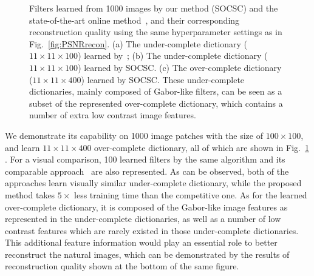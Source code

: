 \begin{figure}[h]
\begin{minipage}{1\textwidth}
    \centering
\end{minipage}
\caption{Filters learned from 1000 images by our method (SOCSC) and the state-of-the-art online method~\cite{liu-2018-first}, and their corresponding reconstruction quality using the same hyperparameter settings as in Fig.\ \ref{fig:PSNRrecon}. (a) The under-complete dictionary ($11 \times 11 \times 100$) learned by~\cite{liu-2018-first}; (b) The under-complete dictionary ($11 \times 11 \times 100$) learned by SOCSC. (c) The over-complete dictionary ($11 \times 11 \times 400$) learned by SOCSC. These under-complete dictionaries, mainly composed of Gabor-like filters, can be seen as a subset of the represented over-complete dictionary, which contains a number of extra low contrast image features.}
\label{fig:overCompleteDic}
\end{figure}

We demonstrate its capability on 1000 image patches with the size of $100 \times 100$, and learn $11 \times 11 \times 400$ over-complete dictionary, all of which are shown in Fig.\ \ref{fig:overCompleteDic} . For a visual comparison, 100 learned filters by the same algorithm and its comparable approach~\cite{liu-2018-first} are also represented. As can be observed, both of the approaches learn visually similar under-complete dictionary, while the proposed method takes $5 \times$ less training time than the competitive one. As for the learned over-complete dictionary, it is composed of the Gabor-like image features as represented in the under-complete dictionaries, as well as a number of low contrast features which are rarely existed in those under-complete dictionaries. This additional feature information would play an essential role to better reconstruct the natural images, which can be demonstrated by the results of reconstruction quality shown at the bottom of the same figure.

